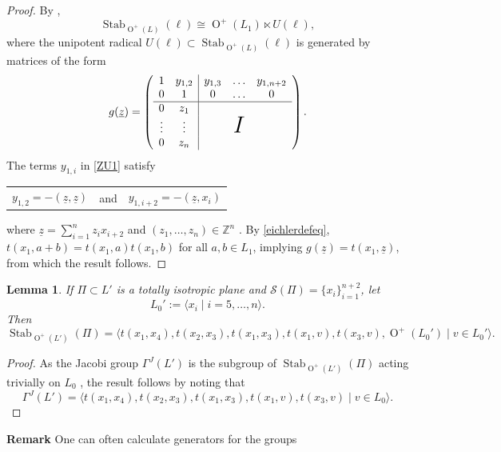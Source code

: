 \documentclass[12pt, a4paper]{article}
\newtheorem{lemma}[theorem]{Lemma}
\newcommand{\ZZ}{\mathbb{Z}}
\newcommand{\la}{\langle}
\newcommand{\ra}{\rangle}
\newcommand{\beq}{\begin{equation*}}
\newcommand{\eeq}{\end{equation*}}
\newcommand{\Sc}{\mathcal{S}}
\newcommand{\opn}{\operatorname}
\begin{document}
\begin{proof}
  By \cite[p.30]{Attwell-Duval-Topological},  
  \beq
  \opn{Stab}_{\opn{O}^+(L)}(\ell) \cong \opn{O}^+(L_1) \ltimes U(\ell),
  \eeq
  where the unipotent radical $U(\ell) \subset \opn{Stab}_{\opn{O}^+(L)}(\ell)$ is generated by matrices of the form
  \begin{equation}\label{ZU1}
    g(\underline{z})=
    \left(
  \begin{array}{c c | c c c }
    1 & y_{1,2} & y_{1,3} & \ldots & y_{1,n+2} \\
    0 & 1 & 0 & \ldots & 0 \\
    \hline
    0 & z_1 & \\
    \vdots & \vdots & & \textbf{\huge{$I$}} & \\
    0 & z_n & 
  \end{array}
  \right) .
  \end{equation}
  The terms $y_{1, i}$ in \eqref{ZU1} satisfy 
  \begin{center}
    \begin{tabular}{c c c}
      $y_{1,2} = -(\underline{z}, \underline{z})$
      & and &
      $y_{1,i+2} = - (\underline{z}, x_i)$
      \end{tabular}
  \end{center}
  where $\underline{z} = \sum_{i=1}^n z_i x_{i+2}$ and $(z_1, \ldots, z_n) \in \ZZ^n$ \cite{Attwell-Duval-Topological}.
  By \eqref{eichlerdefeq},  $t(x_1, a+b) = t(x_1, a) t(x_1,b)$ for all $a,b \in L_1$, implying $g(\underline{z}) = t(x_1, \underline{z})$, from which the result follows.
\end{proof}
\begin{lemma}\label{stab-E-o(L')-gens}
  If $\Pi \subset L'$ is a totally isotropic plane and $\Sc(\Pi) = \{x_i\}_{i=1}^{n+2}$, let
  \beq
  L_0':=\la x_i \mid i=5, \ldots, n \ra.
  \eeq
  Then 
  \beq
  \opn{Stab}_{\opn{O}^+(L')}(\Pi) =
  \la
  t(x_1, x_4),
  t(x_2, x_3),
  t(x_1, x_3),
  t(x_1, v),
  t(x_3, v),
  \opn{O}^+(L_0') \mid v \in L_0'
  \ra.
   \eeq
\end{lemma}
\begin{proof}
  As the Jacobi group $\Gamma^J(L')$ is the subgroup of $\opn{Stab}_{\opn{O}^+(L')}(\Pi)$ acting trivially on $L_0$ \cite{abelianisation}, the result follows by noting that   \cite[p.470]{abelianisation}
  \beq
  \Gamma^J(L')
  =
  \la 
  t(x_1, x_4),
  t(x_2, x_3),
  t(x_1, x_3), 
  t(x_1, v), 
  t(x_3, v) \mid 
   v \in L_0 \ra.
  \eeq
\end{proof}
\noindent \textbf{Remark} 
 One can often calculate generators for the groups
\end{document}
